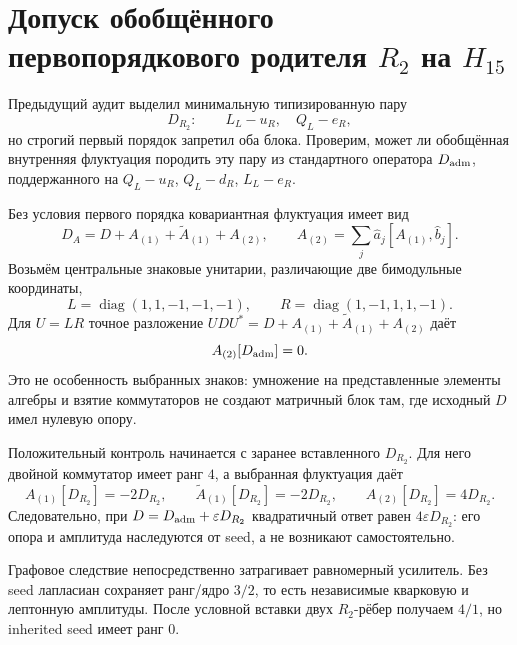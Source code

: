 \chapter{Допуск обобщённого первопорядкового родителя
\texorpdfstring{$R_2$}{R2} на \texorpdfstring{$H_{15}$}{H15}}
\label{ch:v10-h15-r2-generalized-first-order-parent}

Предыдущий аудит выделил минимальную типизированную пару
\begin{equation}
 D_{R_2}:\qquad L_L-u_R,\quad Q_L-e_R,
\end{equation}
но строгий первый порядок запретил оба блока. Проверим, может ли обобщённая
внутренняя флуктуация породить эту пару из стандартного оператора
$D_{\rm adm}$, поддержанного на $Q_L-u_R$, $Q_L-d_R$, $L_L-e_R$.

Без условия первого порядка ковариантная флуктуация имеет вид
\begin{equation}
 D_A=D+A_{(1)}+\widetilde A_{(1)}+A_{(2)},\qquad
 A_{(2)}=\sum_j\widehat a_j[A_{(1)},\widehat b_j].
\end{equation}
Возьмём центральные знаковые унитарии, различающие две бимодульные
координаты,
\begin{equation}
 L=\operatorname{diag}(1,1,-1,-1,-1),\qquad
 R=\operatorname{diag}(1,-1,1,1,-1).
\end{equation}
Для $U=LR$ точное разложение $UDU^*=D+A_{(1)}+\widetilde
A_{(1)}+A_{(2)}$ даёт
\begin{equation}
 A_{(2)}[D_{\rm adm}]=0.
\end{equation}
Это не особенность выбранных знаков: умножение на представленные элементы
алгебры и взятие коммутаторов не создают матричный блок там, где исходный
$D$ имел нулевую опору.

Положительный контроль начинается с заранее вставленного $D_{R_2}$. Для
него двойной коммутатор имеет ранг $4$, а выбранная флуктуация даёт
\begin{equation}
 A_{(1)}[D_{R_2}]=-2D_{R_2},\qquad
 \widetilde A_{(1)}[D_{R_2}]=-2D_{R_2},\qquad
 A_{(2)}[D_{R_2}]=4D_{R_2}.
\end{equation}
Следовательно, при $D=D_{\rm adm}+\varepsilon D_{R_2}$ квадратичный ответ
равен $4\varepsilon D_{R_2}$: его опора и амплитуда наследуются от seed,
а не возникают самостоятельно.

Графовое следствие непосредственно затрагивает равномерный усилитель.
Без seed лапласиан сохраняет ранг/ядро $3/2$, то есть независимые кварковую
и лептонную амплитуды. После условной вставки двух $R_2$-рёбер получаем
$4/1$, но inherited seed имеет ранг $0$.

